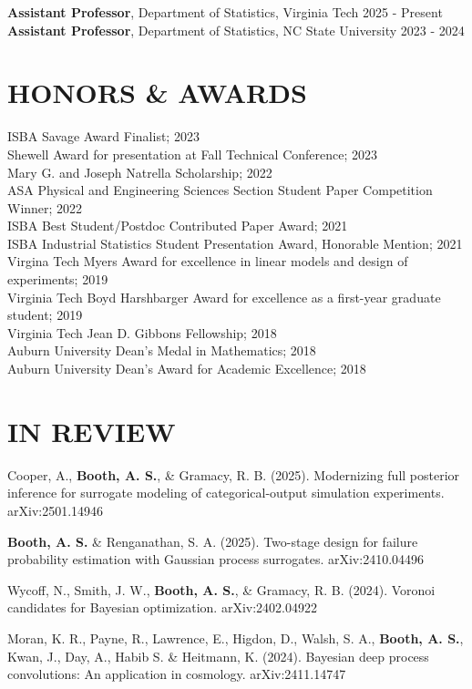 \documentclass[margin,line,11pt]{res}
\begin{document}
\begin{resume}
{\bf Assistant Professor}, Department of Statistics, {\sc Virginia Tech} \hfill 2025 - Present \\
{\bf Assistant Professor}, Department of Statistics, {\sc NC State University} \hfill 2023 - 2024

\bigskip
\section{\bf HONORS \& AWARDS}

ISBA Savage Award Finalist; 2023 \\
Shewell Award for presentation at Fall Technical Conference; 2023 \\
Mary G. and Joseph Natrella Scholarship; 2022 \\
ASA Physical and Engineering Sciences Section Student Paper Competition Winner; 2022 \\
ISBA Best Student/Postdoc Contributed Paper Award; 2021 \\
ISBA Industrial Statistics Student Presentation Award, Honorable Mention; 2021 \\
Virgina Tech Myers Award for excellence in linear models and design of experiments; 2019 \\
Virginia Tech Boyd Harshbarger Award for excellence as a first-year graduate student; 2019 \\
Virginia Tech Jean D. Gibbons Fellowship; 2018 \\
Auburn University Dean's Medal in Mathematics; 2018 \\
Auburn University Dean's Award for Academic Excellence; 2018

\medskip
\section{\bf{IN REVIEW}}

Cooper, A., {\bf Booth, A. S.}, \& Gramacy, R. B. (2025). Modernizing full posterior inference for surrogate modeling of categorical-output simulation experiments. arXiv:2501.14946

{\bf Booth, A. S.} \& Renganathan, S. A. (2025). Two-stage design for failure probability estimation with Gaussian process surrogates. arXiv:2410.04496

Wycoff, N., Smith, J. W., {\bf Booth, A. S.}, \& Gramacy, R. B. (2024). Voronoi candidates 
for Bayesian optimization. arXiv:2402.04922

Moran, K. R., Payne, R., Lawrence, E., Higdon, D., Walsh, S. A., {\bf Booth, A. S.}, Kwan, J., Day, A., Habib S. \& Heitmann, K. (2024). Bayesian deep process convolutions: An application in cosmology. arXiv:2411.14747


\end{resume}
\end{document}
